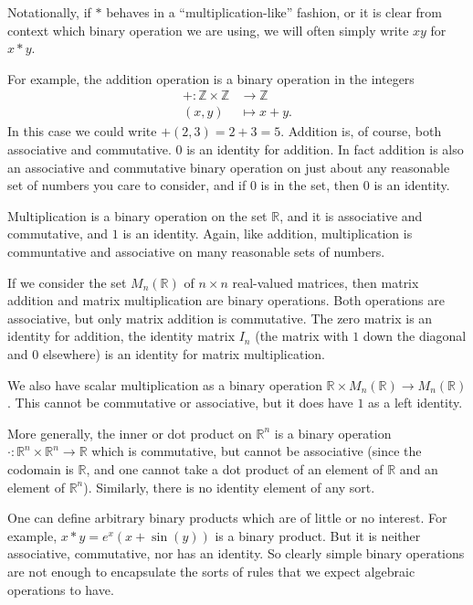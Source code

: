 \documentclass[10pt]{book}
\theoremstyle{break}
\newcounter{example}[section]
\newcommand{\integers}{\ensuremath{\mathbb{Z}}}
\newcommand{\reals}{\ensuremath{\mathbb{R}}}
\newcommand{\cross}{\times}
\begin{document}
Notationally, if $\ast$ behaves in a ``multiplication-like'' fashion, or it
is clear from context which binary operation we are using, we will often simply
write $xy$ for $x \ast y$.

For example, the addition operation is a binary operation in the integers
\begin{align*}
  + : \integers \cross \integers &\to \integers\\
         (x,y) &\mapsto x + y.
\end{align*}
In this case we could write $+(2,3) = 2 + 3 = 5$.  Addition is, of course,
both associative and commutative.  $0$ is an identity for addition.  In fact
addition is also an associative and commutative binary operation on just about
any reasonable set of numbers you care to consider, and if $0$ is in the
set, then $0$ is an identity.

Multiplication is a binary operation on the set $\reals$, and it is associative
and commutative, and $1$ is an identity.  Again, like addition,
multiplication is communtative and associative on many reasonable sets of
numbers.

If we consider the set $M_{n}(\reals)$ of $n \times n$ real-valued matrices,
then matrix addition and matrix multiplication are binary operations.  Both
operations are associative, but only matrix addition is commutative.  The
zero matrix is an identity for addition, the identity matrix $I_{n}$ (the
matrix with $1$ down the diagonal and $0$ elsewhere) is an identity for matrix
multiplication.

We also have scalar multiplication as a binary operation $\reals \cross
M_{n}(\reals) \to M_{n}(\reals)$.  This cannot be commutative or
associative, but it does have $1$ as a left identity.

More generally, the inner or dot product on $\reals^{n}$ is a binary
operation $\cdot: \reals^{n} \cross \reals^{n} \to \reals$ which is
commutative, but cannot be associative (since the codomain is $\reals$, and
one cannot take a dot product of an element of $\reals$ and an element of
$\reals^{n}$).  Similarly, there is no identity element of any sort.

One can define arbitrary binary products which are of little or no interest.
For example, $x \ast y = e^{x}(x + \sin(y))$ is a binary product.  But it is
neither associative, commutative, nor has an identity.  So clearly simple
binary operations are not enough to encapsulate the sorts of rules that we
expect algebraic operations to have.
\end{document}
